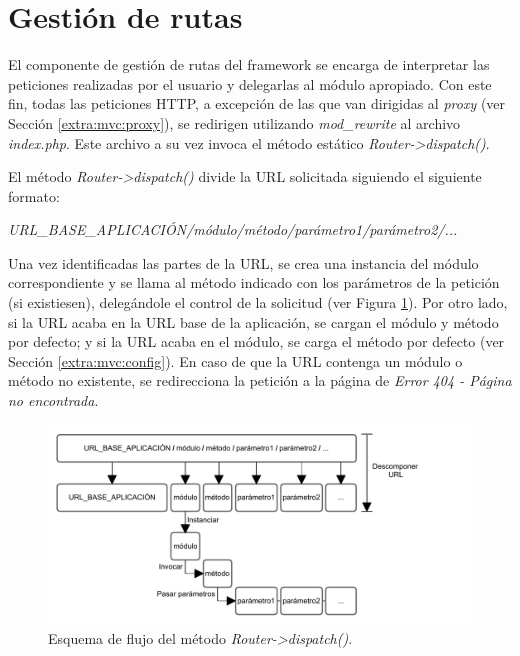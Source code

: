 \section{Gestión de rutas\label{extra:mvc:router}}

El componente de gestión de rutas del \gls{framework} se encarga de interpretar las peticiones realizadas por el usuario y delegarlas al módulo apropiado. Con este fin, todas las peticiones \gls{HTTP}, a excepción de las que van dirigidas al \textit{proxy} (ver Sección \ref{extra:mvc:proxy}), se redirigen utilizando \textit{mod\_rewrite} \cite{modrewrite} al archivo \textit{index.php}. Este archivo a su vez invoca el método estático \textit{Router->dispatch()}.

El método \textit{Router->dispatch()} divide la \gls{URL} solicitada siguiendo el siguiente formato:

\textit{URL\_BASE\_APLICACIÓN/módulo/método/parámetro1/parámetro2/...}

Una vez identificadas las partes de la \gls{URL}, se crea una instancia del módulo correspondiente y se llama al método indicado con los parámetros de la petición (si existiesen), delegándole el control de la solicitud (ver Figura \ref{fig:router}). Por otro lado, si la \gls{URL} acaba en la \gls{URL} base de la aplicación, se cargan el módulo y método por defecto; y si la \gls{URL} acaba en el módulo, se carga el método por defecto (ver Sección \ref{extra:mvc:config}). En caso de que la \gls{URL} contenga un módulo o método no existente, se redirecciona la petición a la página de \textit{Error 404 - Página no encontrada}.

\begin{figure}[!htp]
  \centering
  \includegraphics[width=\textwidth,clip=true]{graphics/router}
  \caption{Esquema de flujo del método \textit{Router->dispatch()}.}
  \label{fig:router}
\end{figure}


